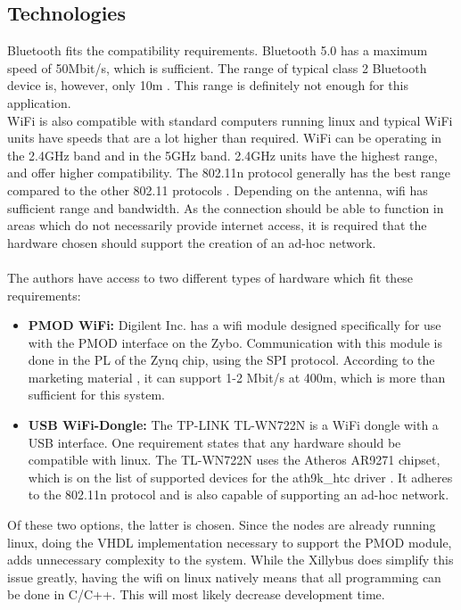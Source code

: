 \subsection{Technologies}
Bluetooth fits the compatibility requirements. 
Bluetooth 5.0 has a maximum speed of 50Mbit/s, which is sufficient.
The range of typical class 2 Bluetooth device is, however, only 10m \cite{bluetooth}.
This range is definitely not enough for this application.
\\
WiFi is also compatible with standard computers running linux and typical WiFi units have speeds that are a lot higher than required. 
WiFi can be operating in the 2.4GHz band and in the 5GHz band. 
2.4GHz units have the highest range, and offer higher compatibility. 
The 802.11n protocol generally has the best range compared to the other 802.11 protocols \cite{wiki_wifi}.
Depending on the antenna, wifi has sufficient range and bandwidth.
As the connection should be able to function in areas which do not necessarily provide internet access, it is required that the hardware chosen should support the creation of an ad-hoc network.\\~\\
The authors have access to two different types of hardware which fit these requirements:
\begin{itemize}
	\item \textbf{PMOD WiFi:} Digilent Inc. has a wifi module designed specifically for use with the PMOD interface on the Zybo.
	Communication with this module is done in the PL of the Zynq chip, using the SPI protocol.
	According to the marketing material \cite{pmodwifi}, it can support 1-2 Mbit/s at 400m, which is more than sufficient for this system.

	\item \textbf{USB WiFi-Dongle:} The TP-LINK TL-WN722N is a WiFi dongle with a USB interface. One requirement states that any hardware should be compatible with linux.
	The TL-WN722N uses the Atheros AR9271 chipset, which is on the list of supported devices for the ath9k\_htc driver \cite{ath9k}.
	It adheres to the 802.11n protocol and is also capable of supporting an ad-hoc network.

\end{itemize}
Of these two options, the latter is chosen.
Since the nodes are already running linux, doing the VHDL implementation necessary to support the PMOD module, adds unnecessary complexity to the system.
While the Xillybus does simplify this issue greatly, having the wifi on linux natively means that all programming can be done in C/C++.
This will most likely decrease development time.
